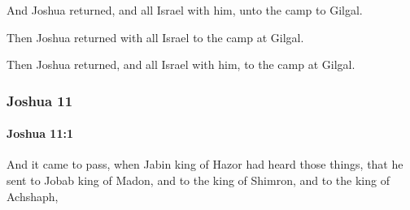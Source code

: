 			\begin{versebox}
					\item[BHS] 
					\item[ASV] And Joshua returned, and all Israel with him, unto the camp to Gilgal.
					\item[NIV] Then Joshua returned with all Israel to the camp at Gilgal.
					\item[NRSV] Then Joshua returned, and all Israel with him, to the camp at Gilgal.
			\end{versebox}
	\subsubsection{Joshua 11} %
		\label{JOSHUA-11}

		\paragraph{Joshua 11:1} %
			\label{JOSHUA-11-1}

			And it came to pass, when Jabin king of Hazor had heard those things, that he sent to Jobab king of Madon, and to the king of Shimron, and to the king of Achshaph,

